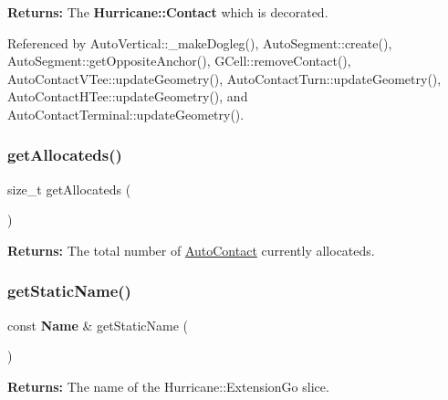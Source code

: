 {\bfseries Returns\+:} The \textbf{ Hurricane\+::\+Contact} which is decorated. 

Referenced by Auto\+Vertical\+::\+\_\+make\+Dogleg(), Auto\+Segment\+::create(), Auto\+Segment\+::get\+Opposite\+Anchor(), G\+Cell\+::remove\+Contact(), Auto\+Contact\+V\+Tee\+::update\+Geometry(), Auto\+Contact\+Turn\+::update\+Geometry(), Auto\+Contact\+H\+Tee\+::update\+Geometry(), and Auto\+Contact\+Terminal\+::update\+Geometry().

\mbox{\label{classKatabatic_1_1AutoContact_a91c8bc1a6bdb1b15c3c084ebfd38af47}} 
\subsubsection{\texorpdfstring{get\+Allocateds()}{getAllocateds()}}
{\footnotesize\ttfamily size\+\_\+t get\+Allocateds (\begin{DoxyParamCaption}{ }\end{DoxyParamCaption})\hspace{0.3cm}{\ttfamily [static]}}

{\bfseries Returns\+:} The total number of \mbox{\hyperlink{classKatabatic_1_1AutoContact}{Auto\+Contact}} currently allocateds. \mbox{\label{classKatabatic_1_1AutoContact_a00e56270cfb31f56e52e31afbc33ba71}} 
\subsubsection{\texorpdfstring{get\+Static\+Name()}{getStaticName()}}
{\footnotesize\ttfamily const \textbf{ Name} \& get\+Static\+Name (\begin{DoxyParamCaption}{ }\end{DoxyParamCaption})\hspace{0.3cm}{\ttfamily [static]}}

{\bfseries Returns\+:} The name of the Hurricane\+::\+Extension\+Go slice. \mbox{\label{classKatabatic_1_1AutoContact_a9e76ae5cee9320b65251387419c9432b}} 
